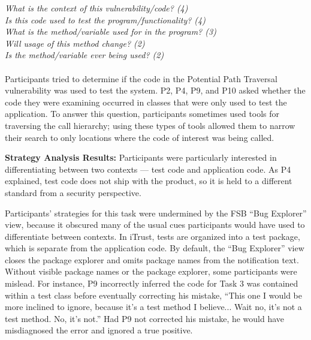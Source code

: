 \documentclass[10pt,journal,compsoc]{IEEEtran}
\begin{document}
\noindent\emph{What is the context of this vulnerability/code? (4)} \\
\emph{Is this code used to test the program/functionality? (4)} \\
\emph{What is the method/variable used for in the program? (3)} \\
\emph{Will usage of this method change? (2)} \\
\emph{Is the method/variable ever being used? (2)} \\
\\


Participants tried to determine if the code in the Potential Path Traversal vulnerability was used to test the system. 
P2, P4, P9, and P10 asked whether the code they were examining occurred in classes that were only used to test the application. 
To answer this question, participants sometimes used tools for traversing the call hierarchy; using these types of tools allowed them to narrow their search to only locations where the code of interest was being called.



\textbf{Strategy Analysis Results:}
Participants were particularly interested in differentiating between two contexts --- test code and application code. 
As P4 explained, test code does not ship with the product, so it is held to a different standard from a security perspective. 

Participants' strategies for this task were undermined by the FSB ``Bug Explorer'' view, because it obscured many of the usual cues participants would have used to differentiate between contexts.
In iTrust, tests are organized into a test package, which is separate from the application code. 
By default, the ``Bug Explorer'' view closes the package explorer and omits package names from the notification text.
Without visible package names or the package explorer, some participants were mislead.
For instance, P9 incorrectly inferred the code for Task 3 was contained within a test class before eventually correcting his mistake, 
``This one I would be more inclined to ignore, because it's a test method I believe... Wait no, it's not a test method. No, it's not.''
Had P9 not corrected his mistake, he would have misdiagnosed the error and ignored a true positive.
\end{document}
